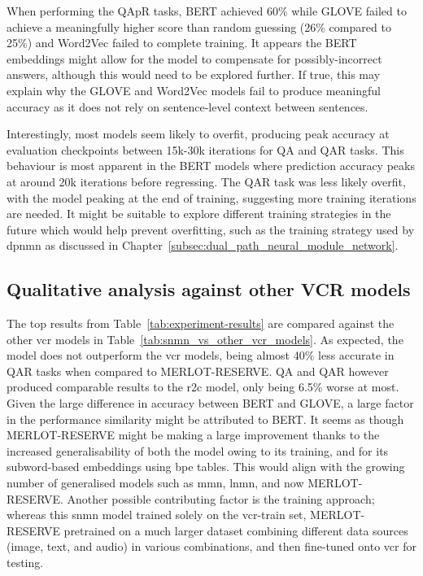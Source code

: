 When performing the QAp\rightarrow{}R tasks, BERT achieved 60\% while GLOVE failed to achieve a meaningfully higher score than random guessing (26\% compared to 25\%) and Word2Vec failed to complete training.
It appears the BERT embeddings might allow for the model to compensate for possibly-incorrect answers, although this would need to be explored further.
If true, this may explain why the GLOVE and Word2Vec models fail to produce meaningful accuracy as it does not rely on sentence-level context between sentences.

Interestingly, most models seem likely to overfit, producing peak accuracy at evaluation checkpoints between 15k-30k iterations for Q\rightarrow{}A and QA\rightarrow{}R tasks.
This behaviour is most apparent in the BERT models where prediction accuracy peaks at around 20k iterations before regressing.
The Q\rightarrow{}AR task was less likely overfit, with the model peaking at the end of training, suggesting more training iterations are needed.
It might be suitable to explore different training strategies in the future which would help prevent overfitting, such as the training strategy used by \gls{dpnmn} as discussed in Chapter~\ref{subsec:dual_path_neural_module_network}.


\subsection{Qualitative analysis against other VCR models}
\label{subsec:qualitative_analysis_against_other_vcr_models}

The top results from Table~\ref{tab:experiment-results} are compared against the other \gls{vcr} models in Table~\ref{tab:snmn_vs_other_vcr_models}.
As expected, the model does not outperform the \gls{vcr} models, being almost 40\% less accurate in Q\rightarrow{}AR tasks when compared to MERLOT-RESERVE.
Q\rightarrow{}A and QA\rightarrow{}R however produced comparable results to the \gls{r2c} model, only being 6.5\% worse at most.
Given the large difference in accuracy between BERT and GLOVE, a large factor in the performance similarity might be attributed to BERT.
It seems as though MERLOT-RESERVE might be making a large improvement thanks to the increased generalisability of both the model owing to its training, and for its subword-based embeddings using \gls{bpe} tables.
This would align with the growing number of generalised models such as \gls{mmn}, \gls{lnmn}, and now MERLOT-RESERVE.
Another possible contributing factor is the training approach; whereas this \gls{snmn} model trained solely on the \gls{vcr}-train set, MERLOT-RESERVE pretrained on a much larger dataset combining different data sources (image, text, and audio) in various combinations, and then fine-tuned onto \gls{vcr} for testing.

